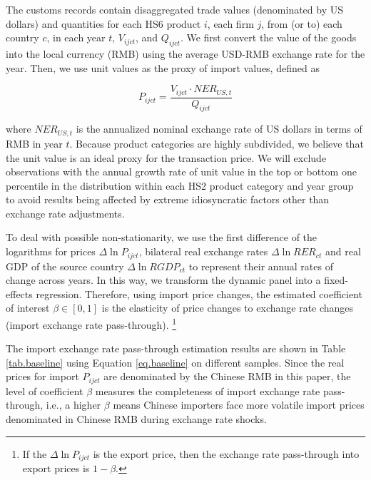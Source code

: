 The customs records contain disaggregated trade values (denominated by US dollars) and quantities for each HS6 product $i$, each firm $j$, from (or to) each country $c$, in each year $t$, $V_{ijct}$, and $Q_{ijct}$. We first convert the value of the goods into the local currency (RMB) using the average USD-RMB exchange rate for the year. Then, we use unit values as the proxy of import values, defined as 

$$
P_{ijct}=\frac{V_{ijct}\cdot NER_{US,t}}{Q_{ijct}}
$$

where $NER_{US,t}$ is the annualized nominal exchange rate of US dollars in terms of RMB in year $t$. Because product categories are highly subdivided, we believe that the unit value is an ideal proxy for the transaction price. We will exclude observations with the annual growth rate of unit value in the top or bottom one percentile in the distribution within each HS2 product category and year group to avoid results being affected by extreme idiosyncratic factors other than exchange rate adjustments.

To deal with possible non-stationarity, we use the first difference of the logarithms for prices $\Delta \ln P_{i j c t}$, bilateral real exchange rates $\Delta \ln R E R_{c t}$ and real GDP of the source country $\Delta \ln R G D P_{c t}$ to represent their annual rates of change across years. In this way, we transform the dynamic panel into a fixed-effects regression. Therefore, using import price changes, the estimated coefficient of interest $\beta \in [0,1]$ is the elasticity of price changes to exchange rate changes (import exchange rate pass-through). \footnote{If the $\Delta \ln P_{i j c t}$ is the export price, then the exchange rate pass-through into export prices is $1-\beta$.}

The import exchange rate pass-through estimation results are shown in Table \ref{tab.baseline} using Equation \ref{eq.baseline} on different samples. Since the real prices for import $P_{i j c t}$ are denominated by the Chinese RMB in this paper, the level of coefficient $\beta$ measures the completeness of import exchange rate pass-through, i.e., a higher $\beta$ means Chinese importers face more volatile import prices denominated in Chinese RMB during exchange rate shocks. 

